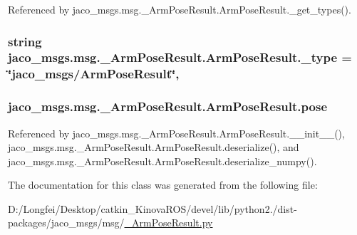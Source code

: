 Referenced by jaco\+\_\+msgs.\+msg.\+\_\+\+Arm\+Pose\+Result.\+Arm\+Pose\+Result.\+\_\+get\+\_\+types().

\subsubsection[{\texorpdfstring{\+\_\+type}{_type}}]{\setlength{\rightskip}{0pt plus 5cm}string jaco\+\_\+msgs.\+msg.\+\_\+\+Arm\+Pose\+Result.\+Arm\+Pose\+Result.\+\_\+type = \char`\"{}jaco\+\_\+msgs/{\bf Arm\+Pose\+Result}\char`\"{}\hspace{0.3cm}{\ttfamily [static]}, {\ttfamily [private]}}\hypertarget{classjaco__msgs_1_1msg_1_1__ArmPoseResult_1_1ArmPoseResult_a2cc6c4935b92b9d8445917be183e2521}{}\label{classjaco__msgs_1_1msg_1_1__ArmPoseResult_1_1ArmPoseResult_a2cc6c4935b92b9d8445917be183e2521}
\subsubsection[{\texorpdfstring{pose}{pose}}]{\setlength{\rightskip}{0pt plus 5cm}jaco\+\_\+msgs.\+msg.\+\_\+\+Arm\+Pose\+Result.\+Arm\+Pose\+Result.\+pose}\hypertarget{classjaco__msgs_1_1msg_1_1__ArmPoseResult_1_1ArmPoseResult_a1ecfceb51d3dc9aa38ea12a77158af38}{}\label{classjaco__msgs_1_1msg_1_1__ArmPoseResult_1_1ArmPoseResult_a1ecfceb51d3dc9aa38ea12a77158af38}


Referenced by jaco\+\_\+msgs.\+msg.\+\_\+\+Arm\+Pose\+Result.\+Arm\+Pose\+Result.\+\_\+\+\_\+init\+\_\+\+\_\+(), jaco\+\_\+msgs.\+msg.\+\_\+\+Arm\+Pose\+Result.\+Arm\+Pose\+Result.\+deserialize(), and jaco\+\_\+msgs.\+msg.\+\_\+\+Arm\+Pose\+Result.\+Arm\+Pose\+Result.\+deserialize\+\_\+numpy().



The documentation for this class was generated from the following file\+:\begin{DoxyCompactItemize}
\item 
D\+:/\+Longfei/\+Desktop/catkin\+\_\+\+Kinova\+R\+O\+S/devel/lib/python2./dist-\/packages/jaco\+\_\+msgs/msg/\hyperlink{__ArmPoseResult_8py}{\+\_\+\+Arm\+Pose\+Result.\+py}\end{DoxyCompactItemize}
